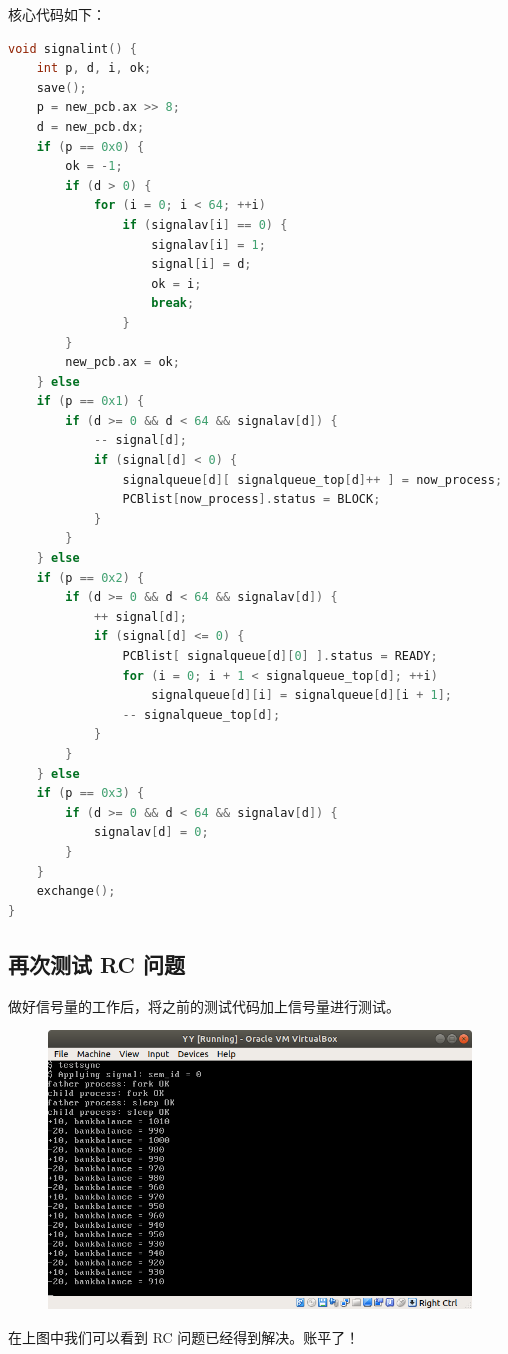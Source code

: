 \documentclass[a4paper]{article}
\begin{document}
核心代码如下：

\begin{lstlisting}[language=C]
void signalint() {
	int p, d, i, ok;
	save();
	p = new_pcb.ax >> 8;
	d = new_pcb.dx;
	if (p == 0x0) {
		ok = -1;
		if (d > 0) {
			for (i = 0; i < 64; ++i)
				if (signalav[i] == 0) {
					signalav[i] = 1;
					signal[i] = d;
					ok = i;
					break;
				}
		}
		new_pcb.ax = ok;
	} else
	if (p == 0x1) {
		if (d >= 0 && d < 64 && signalav[d]) {
			-- signal[d];
			if (signal[d] < 0) {
				signalqueue[d][ signalqueue_top[d]++ ] = now_process;
				PCBlist[now_process].status = BLOCK;
			}
		}
	} else
	if (p == 0x2) {
		if (d >= 0 && d < 64 && signalav[d]) {
			++ signal[d];
			if (signal[d] <= 0) {
				PCBlist[ signalqueue[d][0] ].status = READY;
				for (i = 0; i + 1 < signalqueue_top[d]; ++i)
					signalqueue[d][i] = signalqueue[d][i + 1];
				-- signalqueue_top[d];
			}
		}
	} else
	if (p == 0x3) {
		if (d >= 0 && d < 64 && signalav[d]) {
			signalav[d] = 0;
		}
	}
	exchange();
}
\end{lstlisting}

\subsection{再次测试 RC 问题}

做好信号量的工作后，将之前的测试代码加上信号量进行测试。

\newpage

\begin{figure}[!hbp]
	\centering
	\includegraphics[scale=0.55]{pics/3.png}
\end{figure}

在上图中我们可以看到 RC 问题已经得到解决。账平了！
\end{document}
